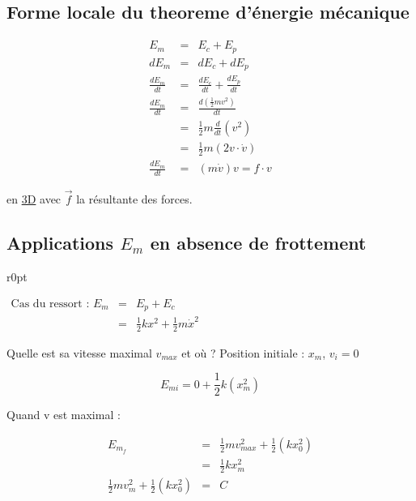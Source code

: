 \subsection{Forme locale du theoreme d'énergie mécanique}

\[\begin{array}{rcl}
	E_m &=& E_c + E_p \\
	dE_m &=& dE_c + dE_p \\
	\frac{dE_m}{dt} &=& \frac{dE_c}{dt} + \frac{dE_p}{dt} \\
	\frac{dE_m}{dt} &=& \frac{d(\frac{1}{2}mv^2)}{dt} \\
&=& \frac{1}{2}m\frac{d}{dt}(v^2) \\
&=& \frac{1}{2}m(2v\cdot \dot{v}) \\
\frac{dE_m}{dt} &=& (m\dot{v})v = f \cdot v \end{array}\]

en \ul{3D}  avec $\vec{f}$ la résultante des forces.

\subsection{Applications $E_m$ en absence de frottement}

\begin{wrapfigure}{r}{0pt}
\end{wrapfigure}
$\begin{array}{rcl}
	\text{Cas du ressort : } E_m &=& E_p + E_c \\
&=& \frac{1}{2}kx^2 + \frac{1}{2}m\dot{x}^2\end{array}$

Quelle est sa vitesse maximal $v_{max}$ et où ?
Position initiale : $x_m$, $v_i = 0$

\[E_{mi} = 0 + \frac{1}{2}k(x_m^2)\]

Quand v est maximal :

\[\begin{array}{rcl}
	E_{m_f} &=& \frac{1}{2}mv^2_{max} + \frac{1}{2}(kx_0^2) \\
	&=& \frac{1}{2}kx_m^2 \\
\frac{1}{2}mv_m^2 + \frac{1}{2}(kx_0^2) &=& C \end{array}\]

